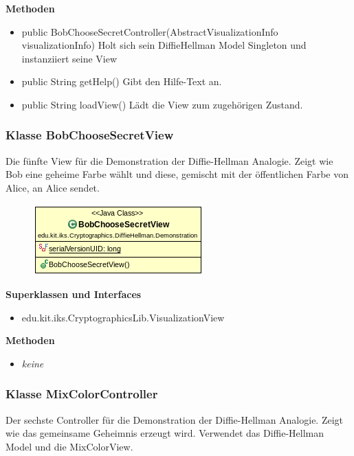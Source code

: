 \documentclass{article}
\begin{document}
      \textbf{Methoden}
      \begin{itemize}
          \item public BobChooseSecretController(AbstractVisualizationInfo visualizationInfo) \newline
              Holt sich sein DiffieHellman Model Singleton und instanziiert seine View
        \item public String getHelp() \newline
        Gibt den Hilfe-Text an.
        \item public String loadView() \newline
        Lädt die View zum zugehörigen Zustand.
      \end{itemize}

\subsubsection{Klasse BobChooseSecretView}
      Die fünfte View für die Demonstration der Diffie-Hellman Analogie.
      Zeigt wie Bob eine geheime Farbe wählt und diese, gemischt mit
      der öffentlichen Farbe von Alice, an Alice sendet.

      \begin{figure}[H]
        \centering
        \includegraphics{resources/edu-kit-iks-Cryptographics-DiffieHellman-Demonstration-BobChooseSecretView}
      \end{figure}

      \textbf{Superklassen und Interfaces}
      \begin{itemize}
        \item edu.kit.iks.CryptographicsLib.VisualizationView
      \end{itemize}

      \textbf{Methoden}
      \begin{itemize}
        \item \textit{keine}
      \end{itemize}

\subsubsection{Klasse MixColorController}
      Der sechste Controller für die Demonstration der Diffie-Hellman Analogie.
      Zeigt wie das gemeinsame Geheimnis erzeugt wird.
      Verwendet das Diffie-Hellman Model und die MixColorView.
\end{document}
